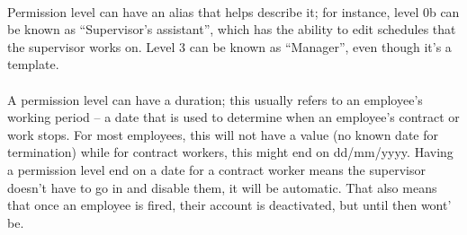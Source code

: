 \documentclass[letterpaper,12pt]{report}
\begin{document}
\paragraph*{}\hspace{0.6cm}Permission level can have an alias that helps describe it; for instance, level 0b can be known as “Supervisor's assistant”, which has the ability to edit schedules that the supervisor works on. Level 3 can be known as “Manager”, even though it's a template. 
\paragraph*{}\hspace{0.6cm}A permission level can have a duration; this usually refers to an employee's working period – a date that is used to determine when an employee's contract or work stops. For most employees, this will not have a value (no known date for termination) while for contract workers, this might end on dd/mm/yyyy. Having a permission level end on a date for a contract worker means the supervisor doesn't have to go in and disable them, it will be automatic. That also means that once an employee is fired, their account is deactivated, but until then wont' be.

\pagebreak
\end{document}
